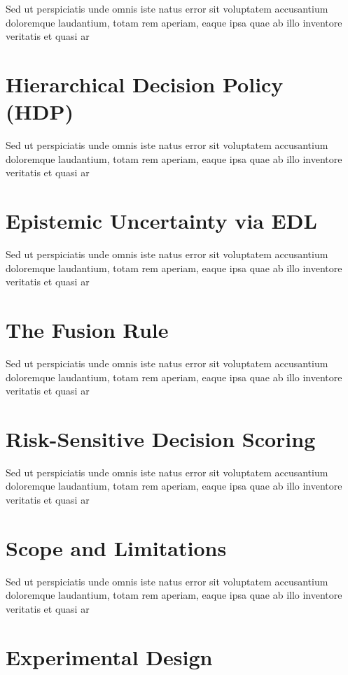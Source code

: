 Sed ut perspiciatis unde omnis iste natus error sit voluptatem accusantium doloremque laudantium, totam rem aperiam, eaque ipsa quae ab illo inventore veritatis et quasi ar

\section{Hierarchical Decision Policy (HDP)}

Sed ut perspiciatis unde omnis iste natus error sit voluptatem accusantium doloremque laudantium, totam rem aperiam, eaque ipsa quae ab illo inventore veritatis et quasi ar

\section{Epistemic Uncertainty via EDL}

Sed ut perspiciatis unde omnis iste natus error sit voluptatem accusantium doloremque laudantium, totam rem aperiam, eaque ipsa quae ab illo inventore veritatis et quasi ar

\section{The Fusion Rule}

Sed ut perspiciatis unde omnis iste natus error sit voluptatem accusantium doloremque laudantium, totam rem aperiam, eaque ipsa quae ab illo inventore veritatis et quasi ar

\section{Risk-Sensitive Decision Scoring}

Sed ut perspiciatis unde omnis iste natus error sit voluptatem accusantium doloremque laudantium, totam rem aperiam, eaque ipsa quae ab illo inventore veritatis et quasi ar

\section{Scope and Limitations}

Sed ut perspiciatis unde omnis iste natus error sit voluptatem accusantium doloremque laudantium, totam rem aperiam, eaque ipsa quae ab illo inventore veritatis et quasi ar

\section{Experimental Design}

